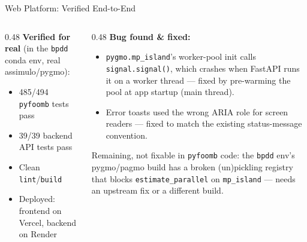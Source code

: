 \documentclass[aspectratio=169, 11pt]{beamer}
\begin{document}
\begin{frame}{Web Platform: Verified End-to-End}
  \begin{columns}[T]
    \begin{column}{0.48\textwidth}
      \textbf{Verified for real} (in the \texttt{bpdd} conda env, real
      assimulo/pygmo):
      \begin{itemize}
        \item[\textcolor{donegreen}{\checkmark}] 485/494 \texttt{pyfoomb} tests pass
        \item[\textcolor{donegreen}{\checkmark}] 39/39 backend API tests pass
        \item[\textcolor{donegreen}{\checkmark}] Clean \texttt{lint}/\texttt{build}
        \item[\textcolor{donegreen}{\checkmark}] Deployed: frontend on Vercel, backend
              on Render
      \end{itemize}
    \end{column}
    \begin{column}{0.48\textwidth}
      \textbf{Bug found \& fixed:}
      \begin{itemize}
        \item \texttt{pygmo.mp\_island}'s worker-pool init calls
              \texttt{signal.signal()}, which crashes when FastAPI runs it on a
              worker thread --- fixed by pre-warming the pool at app startup
              (main thread).
        \item Error toasts used the wrong ARIA role for screen readers --- fixed to
              match the existing status-message convention.
      \end{itemize}
      \vspace{0.15cm}
      {\small Remaining, not fixable in \texttt{pyfoomb} code: the \texttt{bpdd}
      env's pygmo/pagmo build has a broken (un)pickling registry that blocks
      \texttt{estimate\_parallel} on \texttt{mp\_island} --- needs an upstream fix
      or a different build.}
    \end{column}
  \end{columns}
\end{frame}
\end{document}
